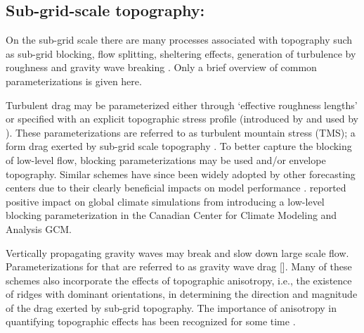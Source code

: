 \documentclass[gmd]{copernicus}
\begin{document}
\subsection{Sub-grid-scale topography: }
On the sub-grid scale there are many processes associated with topography such as sub-grid blocking, flow splitting, sheltering effects, generation of turbulence by roughness and gravity wave breaking \citep{B1990BAMS}. Only a brief overview of common parameterizations is given here.

Turbulent drag may be parameterized either through `effective roughness lengths' \citep{FP1972WJRMS} or  specified with an explicit topographic stress profile (introduced by \citet{WBH2001QJRMS} and used by \citet{BBW2004QJRMS}). These parameterizations are referred to as turbulent mountain stress (TMS); a form drag exerted by sub-grid scale topography \citep[][]{RSG2010JAS}. To better capture the blocking of low-level flow, blocking parameterizations may be used \citep[ECMWF; ][]{LM1997QJRMS} and/or envelope topography. Similar schemes have since been widely adopted by other forecasting centers due to their clearly beneficial impacts on model performance \citep[e.g.][]{WBCJ2003QJR,ZRLC2003AO,KD2005QJRMS}. \citet{SM2000QJRMS} reported positive impact on global climate simulations from introducing a low-level blocking parameterization in the Canadian Center for Climate Modeling and Analysis GCM.  

Vertically propagating gravity waves may break and slow down large scale flow. Parameterizations for that are referred to as gravity wave drag \citep[GWD; ][]{KEC2003AO} [{\color{red}{Julio: earlier reference?}}]. Many of these schemes also incorporate the effects of topographic anisotropy, i.e., the existence of ridges with dominant orientations, in determining  the direction and magnitude of the drag exerted by sub-grid topography.  The importance of anisotropy in quantifying topographic effects has been recognized for some time \citep[e.g.,][]{BP1990ECMWF,B1993JAS}.

\end{document}

